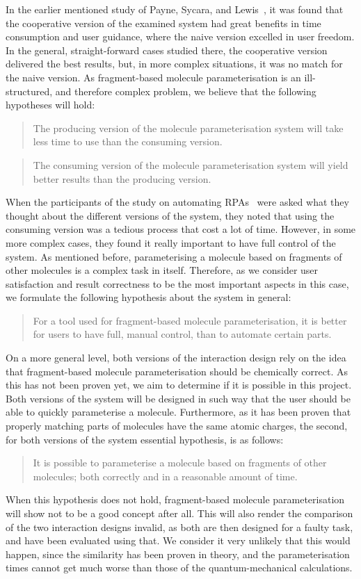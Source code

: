 In the earlier mentioned study of Payne, Sycara, and Lewis~\cite{payne2000varying}, it was found that the cooperative version of the examined system had great benefits in time consumption and user guidance, where the naive version excelled in user freedom. In the general, straight-forward cases studied there, the cooperative version delivered the best results, but, in more complex situations, it was no match for the naive version. As fragment-based molecule parameterisation is an ill-structured, and therefore complex problem, we believe that the following hypotheses will hold:
\begin{quote}
The producing version of the molecule parameterisation system will take less time to use than the consuming version.
\end{quote}
\begin{quote}
The consuming version of the molecule parameterisation system will yield better results than the producing version.
\end{quote}

When the participants of the study on automating RPAs~\cite{payne2000varying} were asked what they thought about the different versions of the system, they noted that using the consuming version was a tedious process that cost a lot of time. However, in some more complex cases, they found it really important to have full control of the system. As mentioned before, parameterising a molecule based on fragments of other molecules is a complex task in itself. Therefore, as we consider user satisfaction and result correctness to be the most important aspects in this case, we formulate the following hypothesis about the system in general:
\begin{quote}
For a tool used for fragment-based molecule parameterisation, it is better for users to have full, manual control, than to automate certain parts.
\end{quote}

On a more general level, both versions of the interaction design rely on the idea that fragment-based molecule parameterisation should be chemically correct. As this has not been proven yet, we aim to determine if it is possible in this project. Both versions of the system will be designed in such way that the user should be able to quickly parameterise a molecule. Furthermore, as it has been proven that properly matching parts of molecules have the same atomic charges, the second, for both versions of the system essential hypothesis, is as follows:
\begin{quote}
It is possible to parameterise a molecule based on fragments of other molecules; both correctly and in a reasonable amount of time.
\end{quote}

When this hypothesis does not hold, fragment-based molecule parameterisation will show not to be a good concept after all. This will also render the comparison of the two interaction designs invalid, as both are then designed for a faulty task, and have been evaluated using that. We consider it very unlikely that this would happen, since the similarity has been proven in theory, and the parameterisation times cannot get much worse than those of the quantum-mechanical calculations.
